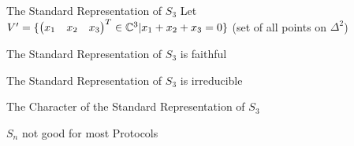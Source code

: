 \begin{frame}{The Standard Representation of $S_3$}
    \large
    Let $V' = \{\begin{pmatrix}
        x_1 & x_2 & x_3
    \end{pmatrix}^T \in \mathbb{C}^3 | x_1 + x_2 + x_3 = 0\}$
    (set of all points on $\Delta^2$)
    

    
    \vspace{1em}
    
\end{frame}

\begin{frame}{The Standard Representation of $S_3$ is faithful}
    
\end{frame}

\begin{frame}{The Standard Representation of $S_3$ is irreducible}
    
\end{frame}

\begin{frame}{The Character of the Standard Representation of $S_3$}
    
\end{frame}

\begin{frame}{$S_n$ not good for most Protocols}
\end{frame}
